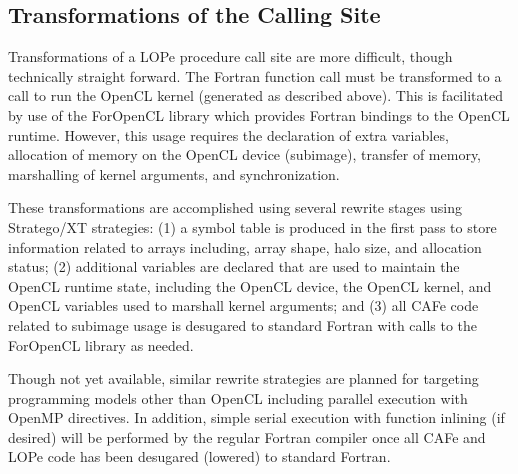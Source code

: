 \subsection{Transformations of the Calling Site}

Transformations of a LOPe procedure call site are more difficult, though technically straight
forward.  The Fortran function call must be transformed to a call to run the OpenCL kernel
(generated as described above).  This is facilitated by use of the ForOpenCL library which
provides Fortran bindings to the OpenCL runtime\cite{Sottile:2013:FTE:2441516.2441520}.  However,
this usage requires the declaration of extra variables, allocation of memory on the OpenCL device
(subimage), transfer of memory, marshalling of kernel arguments, and synchronization.

These transformations are accomplished using several rewrite stages using Stratego/XT strategies:
(1) a symbol table is produced in the first pass to store information related to arrays including,
array shape, halo size, and allocation status;
(2) additional variables are declared that are used to maintain the OpenCL runtime state, including
the OpenCL device, the OpenCL kernel, and OpenCL variables used to marshall kernel arguments; and
(3) all CAFe code related to subimage usage is desugared to standard Fortran with calls to the
ForOpenCL library as needed.

Though not yet available, similar rewrite strategies are planned for targeting programming models
other than OpenCL including parallel execution with OpenMP directives.  In addition, simple serial
execution with function inlining (if desired) will be performed by the regular Fortran compiler once
all CAFe and LOPe code has been desugared (lowered) to standard Fortran.



